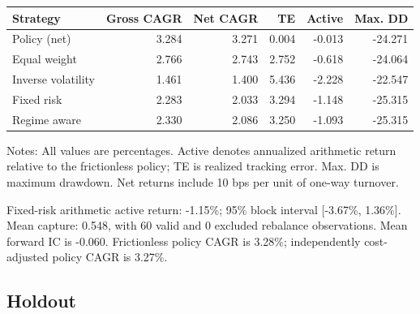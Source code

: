 \documentclass[11pt,a4paper]{article}
\begin{document}
\begin{center}\begin{minipage}{\textwidth}\small
{}\label{tab-validation}
\begin{tabular*}{\textwidth}{@{\extracolsep{\fill}}lrrrrr@{}}\toprule Strategy & Gross CAGR & Net CAGR & TE & Active & Max. DD\\\midrule

Policy (net) & 3.284 & 3.271 & 0.004 & -0.013 & -24.271\\

Equal weight & 2.766 & 2.743 & 2.752 & -0.618 & -24.064\\

Inverse volatility & 1.461 & 1.400 & 5.436 & -2.228 & -22.547\\

Fixed risk & 2.283 & 2.033 & 3.294 & -1.148 & -25.315\\

Regime aware & 2.330 & 2.086 & 3.250 & -1.093 & -25.315\\

\bottomrule\end{tabular*}\par\vspace{4pt}\footnotesize\noindent Notes: All values are percentages. Active denotes annualized arithmetic return relative to the frictionless policy; TE is realized tracking error. Max. DD is maximum drawdown. Net returns include 10 bps per unit of one-way turnover.\end{minipage}\end{center}

Fixed-risk arithmetic active return: -1.15\%; 95\% block interval [-3.67\%, 1.36\%]. Mean capture: 0.548, with 60 valid and 0 excluded rebalance observations. Mean forward IC is -0.060. Frictionless policy CAGR is 3.28\%; independently cost-adjusted policy CAGR is 3.27\%.

\subsection{Holdout}
\end{document}
